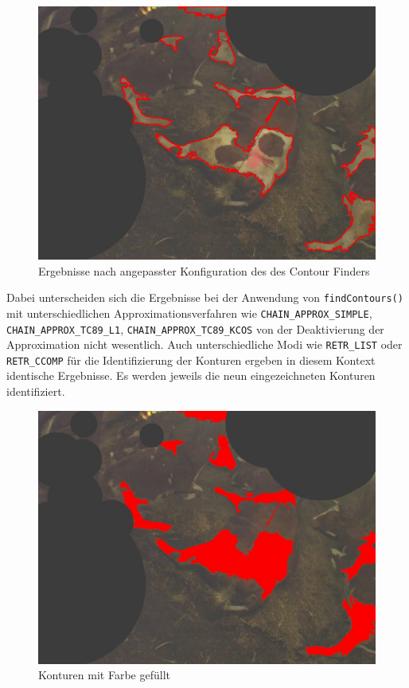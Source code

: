 \begin{figure}[H]
	\center
	\includegraphics[scale=0.43]{Grafiken/entwicklung/13SimpleThresholdingConoturOutlineLIST.jpg}
	\caption{Ergebnisse nach angepasster Konfiguration des des Contour Finders} 
	\label{fig: Ergebnisse nach angepasster Konfiguration des des Contour Finders} 
\end{figure}

Dabei unterscheiden sich die Ergebnisse bei der Anwendung von \texttt{findContours()} mit unterschiedlichen Approximationsverfahren wie \texttt{CHAIN_APPROX_SIMPLE}, \texttt{CHAIN_APPROX_TC89_L1}, \texttt{CHAIN_APPROX_TC89_KCOS} von der Deaktivierung der Approximation  nicht wesentlich. Auch unterschiedliche Modi wie \texttt{RETR_LIST} oder \texttt{RETR_CCOMP} für die Identifizierung der Konturen ergeben in diesem Kontext identische Ergebnisse. Es werden jeweils die neun eingezeichneten Konturen identifiziert.



\begin{figure}[H]
	\center
	\includegraphics[scale=0.43]{Grafiken/entwicklung/14AfterThresholdingContourFilled.jpg}
	\caption{Konturen mit Farbe gefüllt} 
	\label{fig: Konturen mit Farbe gefüllt} 
\end{figure}


